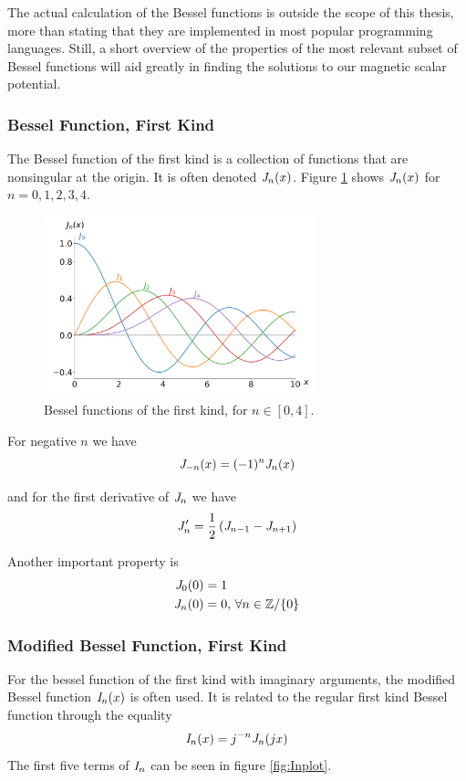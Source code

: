 The actual calculation of the Bessel functions is outside the scope of this thesis,
more than stating that they are implemented in most popular programming languages.
Still, a short overview of the properties of the most relevant subset of Bessel
functions will aid greatly in finding the solutions to our magnetic scalar potential.
\cite{weisstein_bessel}
\subsubsection{Bessel Function, First Kind}

The Bessel function of the first kind is a collection of functions that are nonsingular
at the origin. It is often denoted $\mathit{J}_{n}(x)$. Figure \ref*{fig:Jnplot} shows
$\mathit{J}_{n}(x)$ for $n=0,1,2,3,4$.

\begin{figure}[h]
    \centering
    \includegraphics[width=0.7\textwidth]{figs/Jnplot.png}
    \caption{Bessel functions of the first kind, for $n\in[0,4]$.}
    \label{fig:Jnplot}
\end{figure}

For negative $n$ we have
\begin{equation}
    \mathit{J}_{-n}(x) = (-1)^n \mathit{J}_{n}(x)
\end{equation}

and for the first derivative of $\mathit{J}_{n}$ we have
\begin{equation}
    \mathit{J}_{n}' = \frac{1}{2}\left( \mathit{J}_{n-1} -  \mathit{J}_{n+1} \right)
\end{equation}

Another important property is 
\begin{align}
    \mathit{J}_{0}(0) &= 1 \\
    \mathit{J}_{n}(0) &= 0, \, \forall n\in\mathbb{Z}/\{0\}
\end{align}
\cite{weisstein_bessel_first_kind}
\subsubsection{Modified Bessel Function, First Kind}
For the bessel function of the first kind with imaginary
arguments, the modified Bessel function $\mathit{I}_{n}(x)$ is often used.
It is related to the regular first kind Bessel function
through the equality
\begin{equation}
    \mathit{I}_{n}(x) = j^{-n}\mathit{J}_{n}(jx)
\end{equation}
\cite{weisstein_modified}
The first five terms of $\mathit{I}_{n}$ can be seen in figure \ref*{fig:Inplot}.

